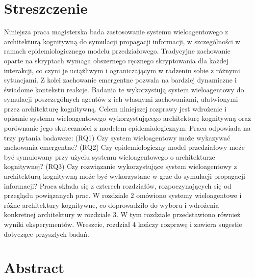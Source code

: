 \section*{Streszczenie}

Niniejsza praca magisterska bada zastosowanie systemu wieloagentowego z architekturą kognitywną do symulacji propagacji informacji, w szczególności w ramach epidemiologicznego modelu przedziałowego. Tradycyjne zachowanie oparte na skryptach wymaga obszernego ręcznego skryptowania dla każdej interakcji, co czyni je uciążliwym i ograniczającym w radzeniu sobie z różnymi sytuacjami. Z kolei zachowanie emergentne pozwala na bardziej dynamiczne i świadome kontekstu reakcje. Badania te wykorzystują system wieloagentowy do symulacji poszczególnych agentów z ich własnymi zachowaniami, ułatwionymi przez architekturę kognitywną. Celem niniejszej rozprawy jest wdrożenie i opisanie systemu wieloagentowego wykorzystującego architekturę kognitywną oraz porównanie jego skuteczności z modelem epidemiologicznym. Praca odpowiada na trzy pytania badawcze: (RQ1) Czy system wieloagentowy może wykazywać zachowania emergentne? (RQ2) Czy epidemiologiczny model przedziałowy może być symulowany przy użyciu systemu wieloagentowego o architekturze kognitywnej? (RQ3) Czy rozwiązanie wykorzystujące system wieloagentowy z architekturą kognitywną może być wykorzystane w grze do symulacji propagacji informacji? Praca składa się z czterech rozdziałów, rozpoczynających się od przeglądu powiązanych prac. W rozdziale 2 omówiono systemy wieloagentowe i różne architektury kognitywne, co doprowadziło do wyboru i wdrożenia konkretnej architektury w rozdziale 3. W tym rozdziale przedstawiono również wyniki eksperymentów. Wreszcie, rozdział 4 kończy rozprawę i zawiera sugestie dotyczące przyszłych badań.

\section*{Abstract}

